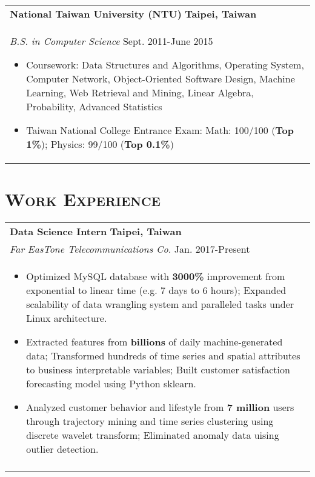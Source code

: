 \documentclass[a4paper,11pt]{article} %
\begin{document}
{\begin{tabular}{p{18.5cm}}
{\bf{National Taiwan University (NTU)}} \hfill \bf{Taipei, Taiwan}\\
{\it B.S. in Computer Science} \hfill Sept. 2011-June 2015
\begin{itemize}
\item Coursework: Data Structures and Algorithms, Operating System, Computer Network, Object-Oriented Software Design, Machine Learning, Web Retrieval and Mining, Linear Algebra, Probability, Advanced Statistics 
\item Taiwan National College Entrance Exam:  Math: 100/100 (\textbf{Top 1\%}); Physics: 99/100 (\textbf{Top 0.1\%})\vspace*{-\baselineskip}
\end{itemize} 
\end{tabular}

\section{\Large\bf\textsc{Work Experience}}
\begin{tabular}{p{18.5cm}}

{\bf{Data Science Intern}} \hfill \bf{Taipei, Taiwan}\\
{\it Far EasTone Telecommunications Co.} \hfill  Jan. 2017-Present\\%
\begin{itemize}
\vspace{-3mm}
\item Optimized MySQL database with {\bf3000\%} improvement from exponential to linear time (e.g. 7 days to 6 hours); Expanded scalability of data wrangling system and paralleled tasks under Linux architecture.
\item Extracted features from {\bf billions} of daily machine-generated data; Transformed hundreds of time series and spatial attributes to business interpretable variables; Built customer satisfaction forecasting model using Python sklearn. 
\item Analyzed customer behavior and lifestyle from {\bf7 million} users through trajectory mining and time series clustering using discrete wavelet transform; Eliminated anomaly data uising outlier detection.\vspace*{-\baselineskip}
\end{itemize} \\ 
\vspace{.1mm}


\end{tabular}}
\end{document}
